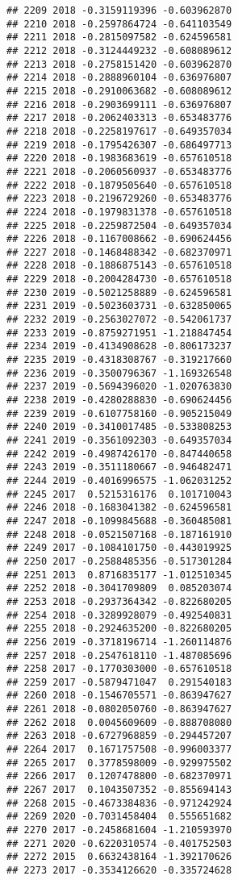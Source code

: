 \documentclass[
]{article}
\begin{document}
\begin{verbatim}
## 2209 2018 -0.3159119396 -0.603962870
## 2210 2018 -0.2597864724 -0.641103549
## 2211 2018 -0.2815097582 -0.624596581
## 2212 2018 -0.3124449232 -0.608089612
## 2213 2018 -0.2758151420 -0.603962870
## 2214 2018 -0.2888960104 -0.636976807
## 2215 2018 -0.2910063682 -0.608089612
## 2216 2018 -0.2903699111 -0.636976807
## 2217 2018 -0.2062403313 -0.653483776
## 2218 2018 -0.2258197617 -0.649357034
## 2219 2018 -0.1795426307 -0.686497713
## 2220 2018 -0.1983683619 -0.657610518
## 2221 2018 -0.2060560937 -0.653483776
## 2222 2018 -0.1879505640 -0.657610518
## 2223 2018 -0.2196729260 -0.653483776
## 2224 2018 -0.1979831378 -0.657610518
## 2225 2018 -0.2259872504 -0.649357034
## 2226 2018 -0.1167008662 -0.690624456
## 2227 2018 -0.1468488342 -0.682370971
## 2228 2018 -0.1886875143 -0.657610518
## 2229 2018 -0.2004284730 -0.657610518
## 2230 2019 -0.5021258889 -0.624596581
## 2231 2019 -0.5023603731 -0.632850065
## 2232 2019 -0.2563027072 -0.542061737
## 2233 2019 -0.8759271951 -1.218847454
## 2234 2019 -0.4134908628 -0.806173237
## 2235 2019 -0.4318308767 -0.319217660
## 2236 2019 -0.3500796367 -1.169326548
## 2237 2019 -0.5694396020 -1.020763830
## 2238 2019 -0.4280288830 -0.690624456
## 2239 2019 -0.6107758160 -0.905215049
## 2240 2019 -0.3410017485 -0.533808253
## 2241 2019 -0.3561092303 -0.649357034
## 2242 2019 -0.4987426170 -0.847440658
## 2243 2019 -0.3511180667 -0.946482471
## 2244 2019 -0.4016996575 -1.062031252
## 2245 2017  0.5215316176  0.101710043
## 2246 2018 -0.1683041382 -0.624596581
## 2247 2018 -0.1099845688 -0.360485081
## 2248 2018 -0.0521507168 -0.187161910
## 2249 2017 -0.1084101750 -0.443019925
## 2250 2017 -0.2588485356 -0.517301284
## 2251 2013  0.8716835177 -1.012510345
## 2252 2018 -0.3041709809  0.085203074
## 2253 2018 -0.2937364342 -0.822680205
## 2254 2018 -0.3289928079 -0.492540831
## 2255 2018 -0.2924635200 -0.822680205
## 2256 2019 -0.3718196714 -1.260114876
## 2257 2018 -0.2547618110 -1.487085696
## 2258 2017 -0.1770303000 -0.657610518
## 2259 2017 -0.5879471047  0.291540183
## 2260 2018 -0.1546705571 -0.863947627
## 2261 2018 -0.0802050760 -0.863947627
## 2262 2018  0.0045609609 -0.888708080
## 2263 2018 -0.6727968859 -0.294457207
## 2264 2017  0.1671757508 -0.996003377
## 2265 2017  0.3778598009 -0.929975502
## 2266 2017  0.1207478800 -0.682370971
## 2267 2017  0.1043507352 -0.855694143
## 2268 2015 -0.4673384836 -0.971242924
## 2269 2020 -0.7031458404  0.555651682
## 2270 2017 -0.2458681604 -1.210593970
## 2271 2020 -0.6220310574 -0.401752503
## 2272 2015  0.6632438164 -1.392170626
## 2273 2017 -0.3534126620 -0.335724628

\end{verbatim}
\end{document}
